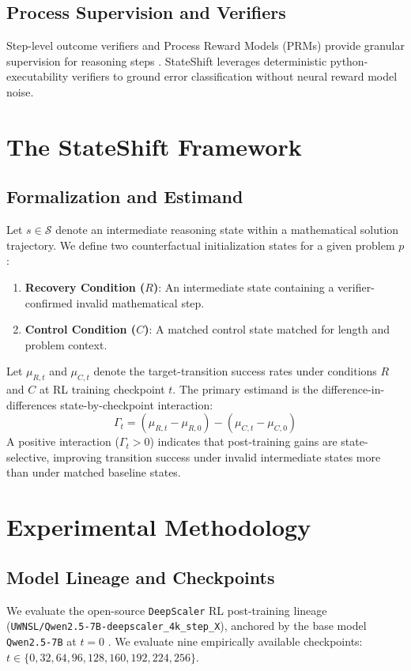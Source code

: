 \documentclass[11pt,3p,review]{elsarticle}
\begin{document}
\subsection{Process Supervision and Verifiers}
Step-level outcome verifiers and Process Reward Models (PRMs) provide granular supervision for reasoning steps \cite{Lightman2023Let}. StateShift leverages deterministic python-executability verifiers to ground error classification without neural reward model noise.

\section{The StateShift Framework}
\subsection{Formalization and Estimand}
Let $s \in \mathcal{S}$ denote an intermediate reasoning state within a mathematical solution trajectory. We define two counterfactual initialization states for a given problem $p$:
\begin{enumerate}
    \item \textbf{Recovery Condition ($R$)}: An intermediate state containing a verifier-confirmed invalid mathematical step.
    \item \textbf{Control Condition ($C$)}: A matched control state matched for length and problem context.
\end{enumerate}

Let $\mu_{R,t}$ and $\mu_{C,t}$ denote the target-transition success rates under conditions $R$ and $C$ at RL training checkpoint $t$. The primary estimand is the difference-in-differences state-by-checkpoint interaction:
\begin{equation}
\Gamma_t = (\mu_{R,t} - \mu_{R,0}) - (\mu_{C,t} - \mu_{C,0})
\end{equation}
A positive interaction ($\Gamma_t > 0$) indicates that post-training gains are state-selective, improving transition success under invalid intermediate states more than under matched baseline states.

\section{Experimental Methodology}
\subsection{Model Lineage and Checkpoints}
We evaluate the open-source \texttt{DeepScaler} RL post-training lineage (\texttt{UWNSL/Qwen2.5-7B-deepscaler\_4k\_step\_X}), anchored by the base model \texttt{Qwen2.5-7B} at $t=0$ \cite{Yang2024Qwen25, Luo2025Deepscaler}. We evaluate nine empirically available checkpoints: $t \in \{0, 32, 64, 96, 128, 160, 192, 224, 256\}$.
\end{document}

